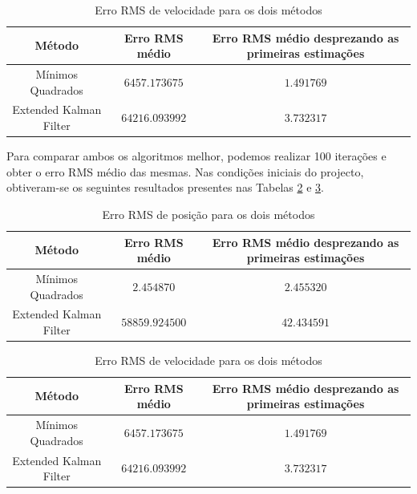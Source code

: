 \documentclass[palatino]{ist-report}
\begin{document}
\begin{table}[ht]
    \centering
    \begin{tabular}{c c c}\toprule
        \textbf{Método} & \textbf{Erro RMS médio} &\textbf{Erro RMS médio desprezando as primeiras estimações}\\
        \midrule
        Mínimos Quadrados & $6457.173675$ & $1.491769$\\
        Extended Kalman Filter & $64216.093992$ & $3.732317$\\
        \bottomrule
    \end{tabular}
    \caption{Erro RMS de velocidade para os dois métodos}
    \label{tab:something2}
\end{table}

Para comparar ambos os algoritmos melhor, podemos realizar 100 iterações e obter o erro RMS médio das mesmas. Nas condições iniciais do projecto, obtiveram-se os seguintes resultados presentes nas Tabelas \ref{tab:something1} e \ref{tab:something2}.
\begin{table}[ht]
    \centering
    \begin{tabular}{c c c}\toprule
        \textbf{Método} & \textbf{Erro RMS médio} &\textbf{Erro RMS médio desprezando as primeiras estimações}\\
        \midrule
        Mínimos Quadrados & $2.454870$ & $2.455320$\\
        Extended Kalman Filter & $58859.924500$ & $42.434591$\\
        \bottomrule
    \end{tabular}
    \caption{Erro RMS de posição para os dois métodos}
    \label{tab:something1}
\end{table}

\begin{table}[ht]
    \centering
    \begin{tabular}{c c c}\toprule
        \textbf{Método} & \textbf{Erro RMS médio} &\textbf{Erro RMS médio desprezando as primeiras estimações}\\
        \midrule
        Mínimos Quadrados & $6457.173675$ & $1.491769$\\
        Extended Kalman Filter & $64216.093992$ & $3.732317$\\
        \bottomrule
    \end{tabular}
    \caption{Erro RMS de velocidade para os dois métodos}
    \label{tab:something2}
\end{table}
\end{document}
